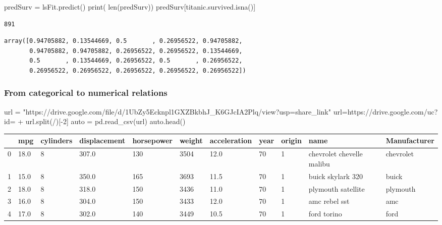 \documentclass[
  letterpaper,
  DIV=11,
  numbers=noendperiod]{scrreprt}
\newenvironment{Shaded}{\begin{snugshade}}{\end{snugshade}}
\newcommand{\BuiltInTok}[1]{\textcolor[rgb]{0.00,0.23,0.31}{#1}}
\newcommand{\DecValTok}[1]{\textcolor[rgb]{0.68,0.00,0.00}{#1}}
\newcommand{\NormalTok}[1]{\textcolor[rgb]{0.00,0.23,0.31}{#1}}
\newcommand{\OperatorTok}[1]{\textcolor[rgb]{0.37,0.37,0.37}{#1}}
\newcommand{\StringTok}[1]{\textcolor[rgb]{0.13,0.47,0.30}{#1}}
\begin{document}
\begin{Shaded}
\begin{Highlighting}[]
\NormalTok{predSurv }\OperatorTok{=}\NormalTok{ lsFit.predict()}
\BuiltInTok{print}\NormalTok{( }\BuiltInTok{len}\NormalTok{(predSurv))}
\NormalTok{predSurv[titanic.survived.isna()]}
\end{Highlighting}
\end{Shaded}

\begin{verbatim}
891
\end{verbatim}

\begin{verbatim}
array([0.94705882, 0.13544669, 0.5       , 0.26956522, 0.94705882,
       0.94705882, 0.94705882, 0.26956522, 0.26956522, 0.13544669,
       0.5       , 0.13544669, 0.26956522, 0.5       , 0.26956522,
       0.26956522, 0.26956522, 0.26956522, 0.26956522, 0.26956522])
\end{verbatim}

\hypertarget{from-categorical-to-numerical-relations}{%
\subsubsection{From categorical to numerical
relations}\label{from-categorical-to-numerical-relations}}

\begin{Shaded}
\begin{Highlighting}[]
\NormalTok{url }\OperatorTok{=} \StringTok{"https://drive.google.com/file/d/1UbZy5Ecknpl1GXZBkbhJ\_K6GJcIA2Plq/view?usp=share\_link"} 
\NormalTok{url}\OperatorTok{=}\StringTok{\textquotesingle{}https://drive.google.com/uc?id=\textquotesingle{}} \OperatorTok{+}\NormalTok{ url.split(}\StringTok{\textquotesingle{}/\textquotesingle{}}\NormalTok{)[}\OperatorTok{{-}}\DecValTok{2}\NormalTok{]}
\NormalTok{auto }\OperatorTok{=}\NormalTok{ pd.read\_csv(url)}
\NormalTok{auto.head()}
\end{Highlighting}
\end{Shaded}

\begin{longtable}[]{@{}lllllllllll@{}}
\toprule()
& mpg & cylinders & displacement & horsepower & weight & acceleration &
year & origin & name & Manufacturer \\
\midrule()
\endhead
0 & 18.0 & 8 & 307.0 & 130 & 3504 & 12.0 & 70 & 1 & chevrolet chevelle
malibu & chevrolet \\
1 & 15.0 & 8 & 350.0 & 165 & 3693 & 11.5 & 70 & 1 & buick skylark 320 &
buick \\
2 & 18.0 & 8 & 318.0 & 150 & 3436 & 11.0 & 70 & 1 & plymouth satellite &
plymouth \\
3 & 16.0 & 8 & 304.0 & 150 & 3433 & 12.0 & 70 & 1 & amc rebel sst &
amc \\
4 & 17.0 & 8 & 302.0 & 140 & 3449 & 10.5 & 70 & 1 & ford torino &
ford \\
\bottomrule()
\end{longtable}
\end{document}
